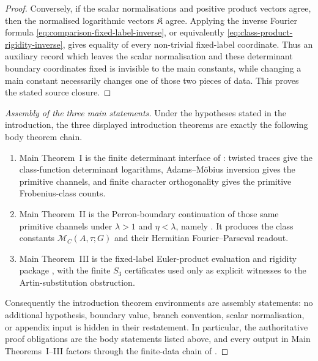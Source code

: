 \documentclass[11pt,a4paper]{amsart}
\theoremstyle{plain}
\theoremstyle{definition}
\theoremstyle{remark}
\begin{document}
\begin{proof}
  Conversely, if the scalar normalisations and positive product vectors agree,
  then the normalised logarithmic vectors \(\mathfrak K\) agree.  Applying the
  inverse Fourier formula \eqref{eq:comparison-fixed-label-inverse}, or
  equivalently \eqref{eq:class-product-rigidity-inverse}, gives equality of
  every non-trivial fixed-label coordinate.  Thus an auxiliary record which
  leaves the scalar normalisation and these determinant boundary coordinates
  fixed is invisible to the main constants, while changing a main constant
  necessarily changes one of those two pieces of data.  This proves the stated
  source closure.
\end{proof}

\begin{proof}[Assembly of the three main statements]
  Under the hypotheses stated in the introduction, the three displayed
  introduction theorems are exactly the following body theorem chain.
  \begin{enumerate}[label=\textup{(\roman*)},leftmargin=*]
    \item Main Theorem~I is the finite determinant interface of
    : twisted traces give the
    class-function determinant logarithms, Adams--M\"obius inversion gives
    the primitive channels, and finite character orthogonality gives the
    primitive Frobenius-class counts.
    \item Main Theorem~II is the Perron-boundary continuation of those same
    primitive channels under \(\lambda>1\) and \(\eta<\lambda\), namely
    .
    It produces the class constants \(\mathcal M_C(A,\tau;G)\) and their
    Hermitian Fourier--Parseval readout.
    \item Main Theorem~III is the fixed-label Euler-product evaluation and
    rigidity package
    ,
    with the finite \(S_3\) certificates used only as explicit witnesses to
    the Artin-substitution obstruction.
  \end{enumerate}
  Consequently the introduction theorem environments are assembly statements:
  no additional hypothesis, boundary value, branch convention, scalar
  normalisation, or appendix input is hidden in their restatement.  In
  particular, the authoritative proof obligations are the body statements
  listed above, and every output in Main Theorems~I--III factors through the
  finite-data chain of .


\end{proof}
\end{document}
